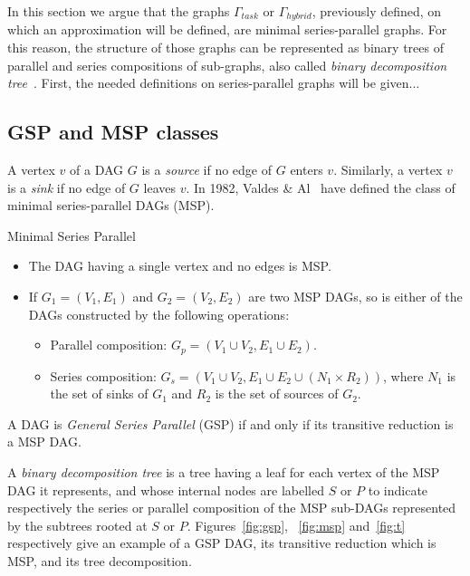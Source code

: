 In this section we argue that the graphs $\Gamma_{task}$ or $\Gamma_{hybrid}$, previously defined, on which an approximation will be defined, are minimal series-parallel graphs. For this reason, the structure of those graphs can be represented as binary trees of parallel and series compositions of sub-graphs, also called \emph{binary decomposition tree}~\cite{Valdes:1979:RSP:800135.804393}. First, the needed definitions on series-parallel graphs will be given...

\subsection{GSP and MSP classes}
A vertex $v$ of a DAG $G$ is a \emph{source} if no edge of $G$ enters $v$. Similarly, a vertex $v$ is a \emph{sink} if no edge of $G$ leaves $v$. In 1982, Valdes \& Al~\cite{Valdes:1979:RSP:800135.804393} have defined the class of minimal series-parallel DAGs (MSP).

\begin{mydef}Minimal Series Parallel
\begin{itemize}
\item The DAG having a single vertex and no edges is MSP.
\item If $G_1=(V_1,E_1)$ and $G_2=(V_2,E_2)$ are two MSP DAGs, so is either of the DAGs constructed by the following operations:
\begin{itemize}
\item Parallel composition: $G_p=(V_1\cup V_2,E_1\cup E_2)$.
\item Series composition: $G_s=(V_1\cup V_2,E_1\cup E_2\cup (N_1 \times R_2))$, where $N_1$ is the set of sinks of $G_1$ and $R_2$ is the set of sources of $G_2$.
\end{itemize}
\end{itemize}
\end{mydef}

\begin{mydef}
A DAG is \emph{General Series Parallel} (GSP) if and only if its transitive reduction is a MSP DAG.
\end{mydef}

A \emph{binary decomposition tree} is a tree having a leaf for each vertex of the MSP DAG it represents, and whose internal nodes are labelled $S$ or $P$ to indicate respectively the series or parallel composition of the MSP sub-DAGs represented by the subtrees rooted at $S$ or $P$. Figures~\ref{fig:gsp}, ~\ref{fig:msp} and~\ref{fig:t} respectively give an example of a GSP DAG, its transitive reduction which is MSP, and its tree decomposition.

